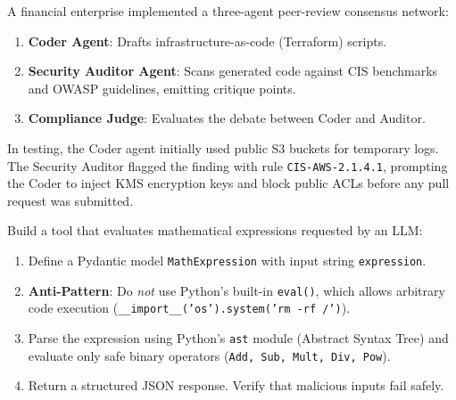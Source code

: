 \begin{realworldbox}
A financial enterprise implemented a three-agent peer-review consensus network:
\begin{enumerate}
  \item \textbf{Coder Agent}: Drafts infrastructure-as-code (Terraform) scripts.
  \item \textbf{Security Auditor Agent}: Scans generated code against CIS benchmarks and OWASP guidelines, emitting critique points.
  \item \textbf{Compliance Judge}: Evaluates the debate between Coder and Auditor.
\end{enumerate}
In testing, the Coder agent initially used public S3 buckets for temporary logs. The Security Auditor flagged the finding with rule \texttt{CIS-AWS-2.1.4.1}, prompting the Coder to inject KMS encryption keys and block public ACLs before any pull request was submitted.
\end{realworldbox}

\begin{tryityourselfbox}
Build a tool that evaluates mathematical expressions requested by an LLM:
\begin{enumerate}
  \item Define a Pydantic model \texttt{MathExpression} with input string \texttt{expression}.
  \item \textbf{Anti-Pattern}: Do \emph{not} use Python's built-in \texttt{eval()}, which allows arbitrary code execution (\texttt{\_\_import\_\_('os').system('rm -rf /')}).
  \item Parse the expression using Python's \texttt{ast} module (Abstract Syntax Tree) and evaluate only safe binary operators (\texttt{Add, Sub, Mult, Div, Pow}).
  \item Return a structured JSON response. Verify that malicious inputs fail safely.
\end{enumerate}
\end{tryityourselfbox}

